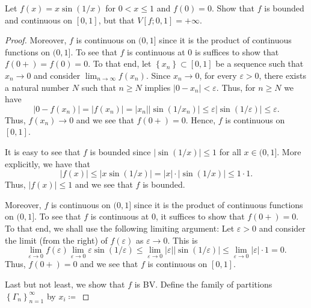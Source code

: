 \begin{problem}
Let $f(x)=x\sin(1/x)$ for $0<x\leq 1$ and $f(0)=0$. Show that $f$ is
bounded and continuous on $[0,1]$, but that $V[f;0,1]=+\infty$.
\end{problem}
\begin{proof}
Moreover, $f$ is continuous on $(0,1]$ since it is the product of
continuous functions on $(0,1]$. To see that $f$ is continuous at $0$ is
suffices to show that $f(0+)=f(0)=0$. To that end, let
$\left\{x_n\right\}\subset[0,1]$ be a sequence such that $x_n\to 0$ and
consider $\lim_{n\to\infty} f\left(x_n\right)$. Since $x_n\to 0$, for every
$\varepsilon>0$, there exists a natural number $N$ such that $n\geq N$
implies $|0-x_n|<\varepsilon$. Thus, for $n\geq N$ we have
\[
\left|0-f(x_n)\right|=\left|f(x_n)\right|=
\left|x_n\right|\left|\sin(1/x_n)\right|\leq
\varepsilon\left|\sin(1/\varepsilon)\right|\leq
\varepsilon.
\]
Thus, $f(x_n)\to 0$ and we see that $f(0+)=0$. Hence, $f$ is continuous on
$[0,1]$.


It is easy to see that $f$ is bounded since $|\sin(1/x)|\leq 1$ for all
$x\in(0,1]$. More explicitly, we have that
\[
|f(x)|\leq |x\sin(1/x)|=|x|\cdot|\sin(1/x)|\leq 1\cdot 1.
\]
Thus, $|f(x)|\leq 1$ and we see that $f$ is bounded.

Moreover, $f$ is continuous on $(0,1]$ since it is the product of
continuous functions on $(0,1]$. To see that $f$ is continuous at $0$, it
suffices to show that $f(0+)=0$. To that end, we shall use the following
limiting argument: Let $\varepsilon>0$ and consider the limit (from the
right) of $f(\varepsilon)$ as $\varepsilon\to 0$. This is
\[
\lim_{\varepsilon\to 0}f(\varepsilon)
\lim_{\varepsilon\to 0}\varepsilon\sin(1/\varepsilon)\leq
\lim_{\varepsilon\to 0}\left|\varepsilon\right|\left|\sin(1/\varepsilon)\right|
\leq\lim_{\varepsilon\to 0}\left|\varepsilon\right|\cdot 1=0.
\]
Thus, $f(0+)=0$ and we see that $f$ is continuous on $[0,1]$.

Last but not least, we show that $f$ is BV. Define the family of partitions
$\left\{\Gamma_n\right\}_{n=1}^\infty$ by $x_i\coloneqq$
\end{proof}
\newpage

